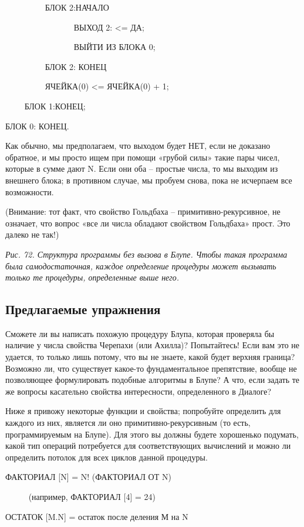 \documentclass[../main.tex]{subfiles}
\begin{document}
~~~~~~~~~ БЛОК 2:НАЧАЛО

~~~~~~~~~~~~~~~~ ВЫХОД 2: \textless= ДА;

~~~~~~~~~~~~~~~~ ВЫЙТИ ИЗ БЛОКА 0;

~~~~~~~~~ БЛОК 2: КОНЕЦ

~~~~~~~~~ ЯЧЕЙКА(0) \textless= ЯЧЕЙКА(0) + 1;

~~~~ БЛОК 1:КОНЕЦ;

БЛОК 0: КОНЕЦ.

Как обычно, мы предполагаем, что выходом будет НЕТ, если не доказано обратное, и мы просто ищем при помощи «грубой силы» такие пары чисел, которые в сумме дают N\@. Если они оба \--- простые числа, то мы выходим из внешнего блока; в противном случае, мы пробуем снова, пока не исчерпаем все возможности.

(Внимание: тот факт, что свойство Гольдбаха \--- примитивно-рекурсивное, не означает, что вопрос «все ли числа обладают свойством Гольдбаха» прост. Это далеко не так!)

\emph{Рис. 72. Структура программы без вызова в Блупе. Чтобы такая программа была самодостаточная, каждое определение процедуры может вызывать только те процедуры, определенные выше него.}


\subsection{Предлагаемые упражнения}

Сможете ли вы написать похожую процедуру Блупа, которая проверяла бы наличие у числа свойства Черепахи (или Ахилла)? Попытайтесь! Если вам это не удается, то только лишь потому, что вы не знаете, какой будет верхняя граница? Возможно ли, что существует какое-то фундаментальное препятствие, вообще не позволяющее формулировать подобные алгоритмы в Блупе? А что, если задать те же вопросы касательно свойства интересности, определенного в Диалоге?

Ниже я привожу некоторые функции и свойства; попробуйте определить для каждого из них, является ли оно примитивно-рекурсивным (то есть, программируемым на Блупе). Для этого вы должны будете хорошенько подумать, какой тип операций потребуется для соответствующих вычислений и можно ли определить потолок для всех циклов данной процедуры.

ФАКТОРИАЛ {[}N{]} = N! (ФАКТОРИАЛ ОТ N)

~~~~~ (например, ФАКТОРИАЛ {[}4{]} = 24)

ОСТАТОК {[}M.N{]} = остаток после деления М на N
\end{document}
